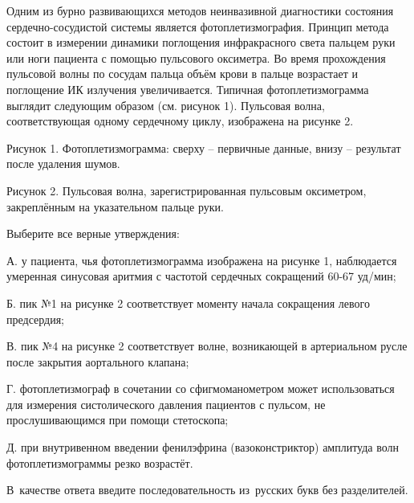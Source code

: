 
Одним из бурно развивающихся методов неинвазивной диагностики состояния сердечно-сосудистой системы является фотоплетизмография. Принцип метода состоит в измерении динамики поглощения инфракрасного света пальцем руки или ноги пациента с помощью пульсового оксиметра. Во время прохождения пульсовой волны по сосудам пальца объём крови в пальце возрастает и поглощение ИК излучения увеличивается. Типичная фотоплетизмограмма выглядит следующим образом (см. рисунок 1). Пульсовая волна, соответствующая одному сердечному циклу, изображена на рисунке 2.


Рисунок 1. Фотоплетизмограмма: сверху – первичные данные, внизу – результат после удаления шумов.


Рисунок 2. Пульсовая волна, зарегистрированная пульсовым оксиметром, закреплённым на указательном пальце руки.

Выберите все верные утверждения:

А. у пациента, чья фотоплетизмограмма изображена на рисунке 1, наблюдается умеренная синусовая аритмия с частотой сердечных сокращений 60-67 уд/мин;

Б. пик №1 на рисунке 2 соответствует моменту начала сокращения левого предсердия;

В. пик №4 на рисунке 2 соответствует волне, возникающей в артериальном русле после закрытия аортального клапана;

Г. фотоплетизмограф в сочетании со сфигмоманометром может использоваться для измерения систолического давления пациентов с пульсом, не прослушивающимся при помощи стетоскопа;

Д. при внутривенном введении фенилэфрина (вазоконстриктор) амплитуда волн фотоплетизмограммы резко возрастёт.

В качестве ответа введите последовательность из русских букв без разделителей.